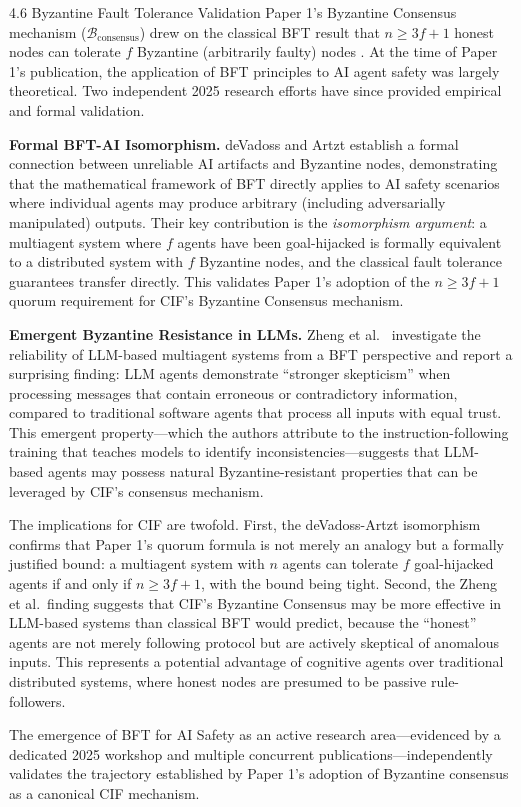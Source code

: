 \documentclass[
  ignorenonframetext,
]{beamer}
\begin{document}
\begin{frame}[allowframebreaks]{4.6 Byzantine Fault Tolerance
Validation}
\protect{}\label{byzantine-fault-tolerance-validation}
Paper 1's Byzantine Consensus mechanism
(\(\mathcal{B}_{\text{consensus}}\)) \cite{friedman2026cogsec1} drew on
the classical BFT result that \(n \geq 3f+1\) honest nodes can tolerate
\(f\) Byzantine (arbitrarily faulty) nodes \cite{lamport1982byzantine}.
At the time of Paper 1's publication, the application of BFT principles
to AI agent safety was largely theoretical. Two independent 2025
research efforts have since provided empirical and formal validation.

\textbf{Formal BFT-AI Isomorphism.} deVadoss and Artzt
\cite{devadoss2025bft} establish a formal connection between unreliable
AI artifacts and Byzantine nodes, demonstrating that the mathematical
framework of BFT directly applies to AI safety scenarios where
individual agents may produce arbitrary (including adversarially
manipulated) outputs. Their key contribution is the \emph{isomorphism
argument}: a multiagent system where \(f\) agents have been
goal-hijacked is formally equivalent to a distributed system with \(f\)
Byzantine nodes, and the classical fault tolerance guarantees transfer
directly. This validates Paper 1's adoption of the \(n \geq 3f+1\)
quorum requirement for CIF's Byzantine Consensus mechanism.

\textbf{Emergent Byzantine Resistance in LLMs.} Zheng et
al.~\cite{zheng2025rethinking} investigate the reliability of LLM-based
multiagent systems from a BFT perspective and report a surprising
finding: LLM agents demonstrate ``stronger skepticism'' when processing
messages that contain erroneous or contradictory information, compared
to traditional software agents that process all inputs with equal trust.
This emergent property---which the authors attribute to the
instruction-following training that teaches models to identify
inconsistencies---suggests that LLM-based agents may possess natural
Byzantine-resistant properties that can be leveraged by CIF's consensus
mechanism.

The implications for CIF are twofold. First, the deVadoss-Artzt
isomorphism confirms that Paper 1's quorum formula is not merely an
analogy but a formally justified bound: a multiagent system with \(n\)
agents can tolerate \(f\) goal-hijacked agents if and only if
\(n \geq 3f+1\), with the bound being tight. Second, the Zheng et
al.~finding suggests that CIF's Byzantine Consensus may be more
effective in LLM-based systems than classical BFT would predict, because
the ``honest'' agents are not merely following protocol but are actively
skeptical of anomalous inputs. This represents a potential advantage of
cognitive agents over traditional distributed systems, where honest
nodes are presumed to be passive rule-followers.

The emergence of BFT for AI Safety as an active research
area---evidenced by a dedicated 2025 workshop and multiple concurrent
publications---independently validates the trajectory established by
Paper 1's adoption of Byzantine consensus as a canonical CIF mechanism.
\end{frame}
\end{document}
